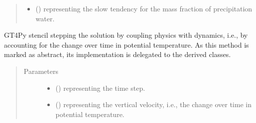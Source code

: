 \documentclass[letterpaper,10pt,english]{sphinxmanual}
\begin{document}
\begin{fulllineitems}
\begin{fulllineitems}
\begin{quote}
\begin{description}
\begin{itemize}
\item {} 
 () \textendash{}  representing the slow tendency for the mass fraction of precipitation water.

\end{itemize}


\end{description}\end{quote}

\end{fulllineitems}


\begin{fulllineitems}
\label{\detokenize{api:tasmania.dycore.prognostic_isentropic_nonconservative_centered.PrognosticIsentropicNonconservativeCentered._stencil_stepping_by_coupling_physics_with_dynamics_defs}}
GT4Py stencil stepping the solution by coupling physics with dynamics, i.e., by accounting for the
change over time in potential temperature.
As this method is marked as abstract, its implementation is delegated to the derived classes.
\begin{quote}\begin{description}
\item[{Parameters}] \leavevmode\begin{itemize}
\item {} 
 () \textendash{}  representing the time step.

\item {} 
 () \textendash{}  representing the vertical velocity, i.e., the change over time in potential temperature.


\end{itemize}
\end{description}
\end{quote}
\end{fulllineitems}
\end{fulllineitems}
\end{document}
